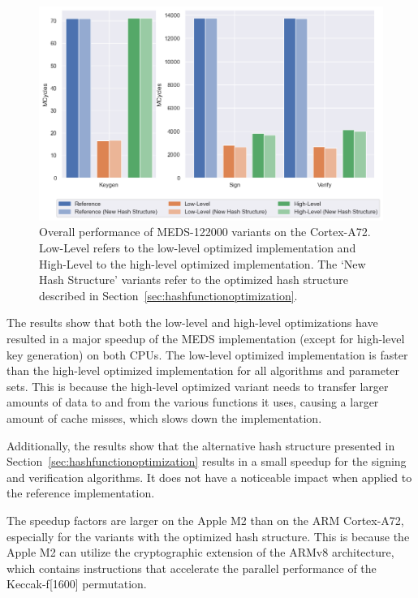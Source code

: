\documentclass[11pt,a4paper]{report}
\theoremstyle{definition}
\begin{document}
\begin{figure}
  \centering
  \includegraphics[width=\textwidth]{plots/barplot_MEDS-122000.png}
  \caption{Overall performance of MEDS-122000 variants on the Cortex-A72. Low-Level refers to the low-level optimized implementation and High-Level to the high-level optimized implementation. The `New Hash Structure' variants refer to the optimized hash structure described in Section~\ref{sec:hashfunctionoptimization}.}
  \label{fig:overal_performance_bar_chart_MEDS-122000}
\end{figure}

The results show that both the low-level and high-level optimizations have resulted in a major speedup of the MEDS implementation (except for high-level key generation) on both CPUs. The low-level optimized implementation is faster than the high-level optimized implementation for all algorithms and parameter sets. This is because the high-level optimized variant needs to transfer larger amounts of data to and from the various functions it uses, causing a larger amount of cache misses, which slows down the implementation.

Additionally, the results show that the alternative hash structure presented in Section~\ref{sec:hashfunctionoptimization} results in a small speedup for the signing and verification algorithms. It does not have a noticeable impact when applied to the reference implementation.

The speedup factors are larger on the Apple M2 than on the ARM Cortex-A72, especially for the variants with the optimized hash structure. This is because the Apple M2 can utilize the cryptographic extension of the ARMv8 architecture, which contains instructions that accelerate the parallel performance of the Keccak-f[1600] permutation.
\end{document}
